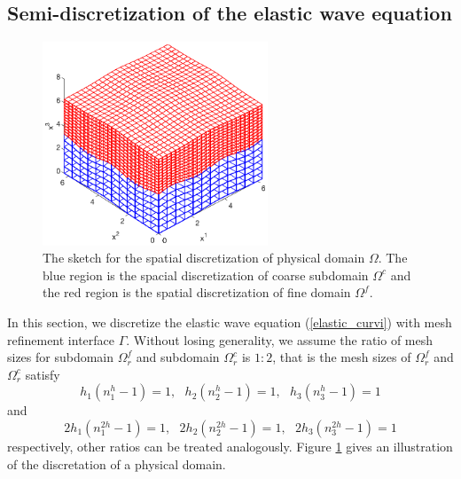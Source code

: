\subsection{Semi-discretization of the elastic wave equation}\label{semi_discrete_form}

\begin{figure}[htbp]
	\centering
	\includegraphics[width=0.6\textwidth,trim={0.4cm 0.7cm 0.8cm 1.4cm}, clip]{physical_discretization.eps}
	\caption{The sketch for the spatial discretization of physical domain $\Omega$. The blue region is the spacial discretization of coarse subdomain $\Omega^c$ and the red region is the spatial discretization of fine domain $\Omega^f$.}\label{physical_discretization}
\end{figure}

In this section, we discretize the elastic wave equation (\ref{elastic_curvi}) with mesh refinement interface $\Gamma$. Without losing generality, we assume the ratio of mesh sizes for subdomain $\Omega^f_r$ and subdomain $\Omega^c_r$ is $1:2$, that is the mesh sizes of $\Omega_r^f$ and $\Omega_r^c$ satisfy
\[h_1(n_1^h-1) = 1, \ \ \ h_2(n_2^h-1) = 1, \ \ \ h_3(n_3^h-1) = 1\]
and
\[2h_1(n_1^{2h}-1) = 1, \ \ \ 2h_2(n_2^{2h}-1) = 1, \ \ \ 2h_3(n_3^{2h}-1) = 1\]
respectively, other ratios can be treated analogously. Figure \ref{physical_discretization} gives an illustration of the discretation of a physical domain. 

